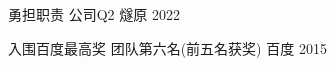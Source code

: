 
\begin{cvhonors}

  \cvhonor
    {勇担职责} %
    {公司Q2} %
    {燧原} %
    {2022} %

  \cvhonor
    {入围百度最高奖} %
    {团队第六名(前五名获奖)} %
    {百度} %
    {2015} %

%
%
%
\end{cvhonors}
